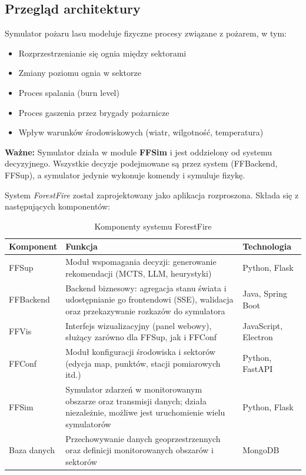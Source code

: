 \documentclass[11pt,a4paper]{article}
\begin{document}
\subsection{Przegląd architektury}

Symulator pożaru lasu modeluje fizyczne procesy związane z pożarem, w tym:
\begin{itemize}
    \item Rozprzestrzenianie się ognia między sektorami
    \item Zmiany poziomu ognia w sektorze
    \item Proces spalania (burn level)
    \item Proces gaszenia przez brygady pożarnicze
    \item Wpływ warunków środowiskowych (wiatr, wilgotność, temperatura)
\end{itemize}

\textbf{Ważne:} Symulator działa w module \textbf{FFSim} i jest oddzielony od systemu decyzyjnego. Wszystkie decyzje podejmowane są przez system (FFBackend, FFSup), a symulator jedynie wykonuje komendy i symuluje fizykę.



System \textit{ForestFire} został zaprojektowany jako aplikacja rozproszona. 
Składa się z następujących komponentów:

\begin{table}[h!]
\centering
\caption{Komponenty systemu ForestFire}
\label{tab:forestfire_components}
\begin{tabular}{|l|p{7cm}|l|}
\hline
\textbf{Komponent} & \textbf{Funkcja} & \textbf{Technologia} \\ \hline
FFSup &
Moduł wspomagania decyzji: generowanie rekomendacji (MCTS, LLM, heurystyki) &
Python, Flask \\ \hline
FFBackend &
Backend biznesowy: agregacja stanu świata i udostępnianie go frontendowi (SSE), walidacja oraz przekazywanie rozkazów do symulatora &
Java, Spring Boot \\ \hline
FFVis &
Interfejs wizualizacyjny (panel webowy), służący zarówno dla FFSup, jak i FFConf &
JavaScript, Electron \\ \hline
FFConf &
Moduł konfiguracji środowiska i sektorów (edycja map, punktów, stacji pomiarowych itd.) &
Python, FastAPI \\ \hline
FFSim &
Symulator zdarzeń w monitorowanym obszarze oraz transmisji danych; działa niezależnie, możliwe jest uruchomienie wielu symulatorów &
Python, Flask \\ \hline
Baza danych &
Przechowywanie danych geoprzestrzennych oraz definicji monitorowanych obszarów i sektorów &
MongoDB \\ \hline
\end{tabular}
\end{table}
\end{document}
